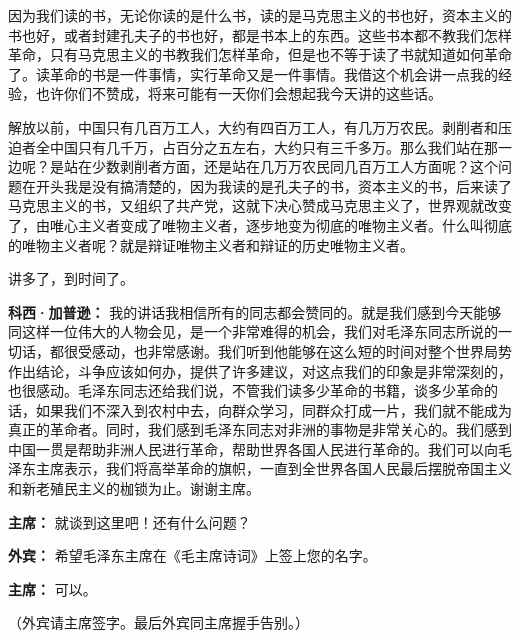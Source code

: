 \begin{list}{}
因为我们读的书，无论你读的是什么书，读的是马克思主义的书也好，资本主义的书也好，或者封建孔夫子的书也好，都是书本上的东西。这些书本都不教我们怎样革命，只有马克思主义的书教我们怎样革命，但是也不等于读了书就知道如何革命了。读革命的书是一件事情，实行革命又是一件事情。我借这个机会讲一点我的经验，也许你们不赞成，将来可能有一天你们会想起我今天讲的这些话。

解放以前，中国只有几百万工人，大约有四百万工人，有几万万农民。剥削者和压迫者全中国只有几千万，占百分之五左右，大约只有三千多万。那么我们站在那一边呢？是站在少数剥削者方面，还是站在几万万农民同几百万工人方面呢？这个问题在开头我是没有搞清楚的，因为我读的是孔夫子的书，资本主义的书，后来读了马克思主义的书，又组织了共产党，这就下决心赞成马克思主义了，世界观就改变了，由唯心主义者变成了唯物主义者，逐步地变为彻底的唯物主义者。什么叫彻底的唯物主义者呢？就是辩证唯物主义者和辩证的历史唯物主义者。

讲多了，到时间了。

\item[\textbf{科西·加普逊：}] 我的讲话我相信所有的同志都会赞同的。就是我们感到今天能够同这样一位伟大的人物会见，是一个非常难得的机会，我们对毛泽东同志所说的一切话，都很受感动，也非常感谢。我们听到他能够在这么短的时间对整个世界局势作出结论，斗争应该如何办，提供了许多建议，对这点我们的印象是非常深刻的，也很感动。毛泽东同志还给我们说，不管我们读多少革命的书籍，谈多少革命的话，如果我们不深入到农村中去，向群众学习，同群众打成一片，我们就不能成为真正的革命者。同时，我们感到毛泽东同志对非洲的事物是非常关心的。我们感到中国一贯是帮助非洲人民进行革命，帮助世界各国人民进行革命的。我们可以向毛泽东主席表示，我们将高举革命的旗帜，一直到全世界各国人民最后摆脱帝国主义和新老殖民主义的枷锁为止。谢谢主席。

\item[\textbf{主席：}] 就谈到这里吧！还有什么问题？

\item[\textbf{外宾：}] 希望毛泽东主席在《毛主席诗词》上签上您的名字。

\item[\textbf{主席：}] 可以。

（外宾请主席签字。最后外宾同主席握手告别。）
\end{list}
